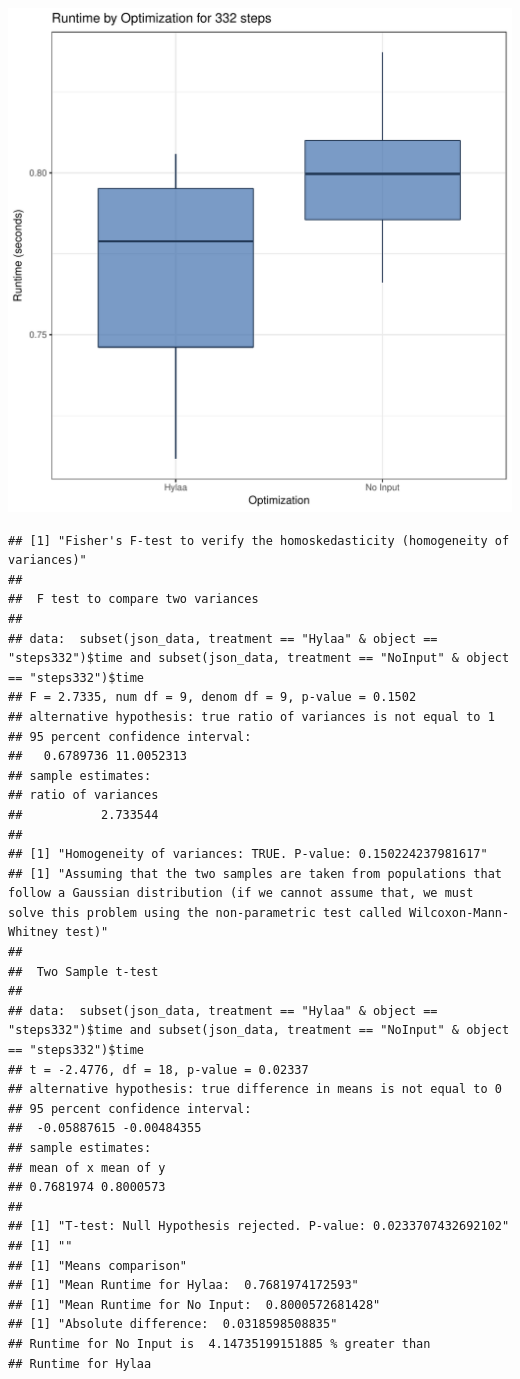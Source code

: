 \documentclass{article}\usepackage[]{graphicx}\usepackage[]{color}
\makeatletter
\def\maxwidth{ %
  \ifdim\Gin@nat@width>\linewidth
    \linewidth
  \else
    \Gin@nat@width
  \fi
}
\newenvironment{kframe}{%
 \def\at@end@of@kframe{}%
 \ifinner\ifhmode%
  \def\at@end@of@kframe{\end{minipage}}%
  \begin{minipage}{\columnwidth}%
 \fi\fi%
 \def\FrameCommand##1{\hskip\@totalleftmargin \hskip-\fboxsep
 \colorbox{shadecolor}{##1}\hskip-\fboxsep
     \hskip-\linewidth \hskip-\@totalleftmargin \hskip\columnwidth}%
 \MakeFramed {\advance\hsize-\width
   \@totalleftmargin\z@ \linewidth\hsize
   \@setminipage}}%
 {\par\unskip\endMakeFramed%
 \at@end@of@kframe}
\newenvironment{knitrout}{}{} %
\makeatother
\begin{document}
\begin{knitrout}
\color{fgcolor}
\includegraphics[width=\maxwidth]{figure/RH4_steps332-1} 
\begin{kframe}\begin{verbatim}
## [1] "Fisher's F-test to verify the homoskedasticity (homogeneity of variances)"
## 
## 	F test to compare two variances
## 
## data:  subset(json_data, treatment == "Hylaa" & object == "steps332")$time and subset(json_data, treatment == "NoInput" & object == "steps332")$time
## F = 2.7335, num df = 9, denom df = 9, p-value = 0.1502
## alternative hypothesis: true ratio of variances is not equal to 1
## 95 percent confidence interval:
##   0.6789736 11.0052313
## sample estimates:
## ratio of variances 
##           2.733544 
## 
## [1] "Homogeneity of variances: TRUE. P-value: 0.150224237981617"
## [1] "Assuming that the two samples are taken from populations that follow a Gaussian distribution (if we cannot assume that, we must solve this problem using the non-parametric test called Wilcoxon-Mann-Whitney test)"
## 
## 	Two Sample t-test
## 
## data:  subset(json_data, treatment == "Hylaa" & object == "steps332")$time and subset(json_data, treatment == "NoInput" & object == "steps332")$time
## t = -2.4776, df = 18, p-value = 0.02337
## alternative hypothesis: true difference in means is not equal to 0
## 95 percent confidence interval:
##  -0.05887615 -0.00484355
## sample estimates:
## mean of x mean of y 
## 0.7681974 0.8000573 
## 
## [1] "T-test: Null Hypothesis rejected. P-value: 0.0233707432692102"
## [1] ""
## [1] "Means comparison"
## [1] "Mean Runtime for Hylaa:  0.7681974172593"
## [1] "Mean Runtime for No Input:  0.8000572681428"
## [1] "Absolute difference:  0.0318598508835"
## Runtime for No Input is  4.14735199151885 % greater than 
## Runtime for Hylaa
\end{verbatim}
\end{kframe}
\end{knitrout}
\end{document}
